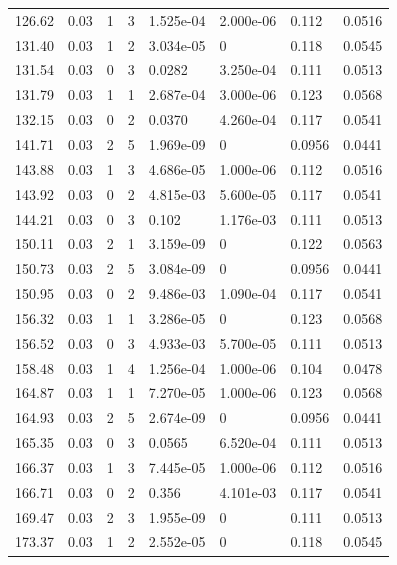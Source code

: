 \documentclass[preview]{standalone}
\begin{document}
{{{\begin{tabular}{L{1.2cm}C{1.2cm} C{0.3cm}C{0.5cm} C{1.4cm}C{1.4cm} C{1.4cm}C{1.4cm}}
  126.62  &  0.03  & 1     &  3 &  1.525e-04  & 2.000e-06  & 0.112 &  0.0516   \\ 
  131.40  &  0.03  & 1     &  2 &  3.034e-05  & 0  & 0.118 &  0.0545   \\ 
  131.54  &  0.03  & 0     &  3 &  0.0282  & 3.250e-04  & 0.111 &  0.0513   \\ 
  131.79  &  0.03  & 1     &  1 &  2.687e-04  & 3.000e-06  & 0.123 &  0.0568   \\ 
  132.15  &  0.03  & 0     &  2 &  0.0370  & 4.260e-04  & 0.117 &  0.0541   \\ 
  141.71  &  0.03  & 2     &  5 &  1.969e-09  & 0  & 0.0956 &  0.0441   \\ 
  143.88  &  0.03  & 1     &  3 &  4.686e-05  & 1.000e-06  & 0.112 &  0.0516   \\ 
  143.92  &  0.03  & 0     &  2 &  4.815e-03  & 5.600e-05  & 0.117 &  0.0541   \\ 
  144.21  &  0.03  & 0     &  3 &  0.102  & 1.176e-03  & 0.111 &  0.0513   \\ 
  150.11  &  0.03  & 2     &  1 &  3.159e-09  & 0  & 0.122 &  0.0563   \\ 
  150.73  &  0.03  & 2     &  5 &  3.084e-09  & 0  & 0.0956 &  0.0441   \\ 
  150.95  &  0.03  & 0     &  2 &  9.486e-03  & 1.090e-04  & 0.117 &  0.0541   \\ 
  156.32  &  0.03  & 1     &  1 &  3.286e-05  & 0  & 0.123 &  0.0568   \\ 
  156.52  &  0.03  & 0     &  3 &  4.933e-03  & 5.700e-05  & 0.111 &  0.0513   \\ 
  158.48  &  0.03  & 1     &  4 &  1.256e-04  & 1.000e-06  & 0.104 &  0.0478   \\ 
  164.87  &  0.03  & 1     &  1 &  7.270e-05  & 1.000e-06  & 0.123 &  0.0568   \\ 
  164.93  &  0.03  & 2     &  5 &  2.674e-09  & 0  & 0.0956 &  0.0441   \\ 
  165.35  &  0.03  & 0     &  3 &  0.0565  & 6.520e-04  & 0.111 &  0.0513   \\ 
  166.37  &  0.03  & 1     &  3 &  7.445e-05  & 1.000e-06  & 0.112 &  0.0516   \\ 
  166.71  &  0.03  & 0     &  2 &  0.356  & 4.101e-03  & 0.117 &  0.0541   \\ 
  169.47  &  0.03  & 2     &  3 &  1.955e-09  & 0  & 0.111 &  0.0513   \\ 
  173.37  &  0.03  & 1     &  2 &  2.552e-05  & 0  & 0.118 &  0.0545   \\ 

\end{tabular}}}}
\end{document}
